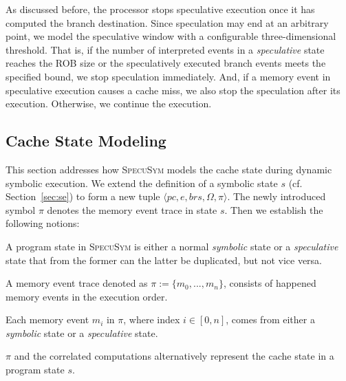 \documentclass[sigconf]{acmart}
\newcommand\ignore[1]{}
\newcommand{\pcon}{\mathit{pc}}
\newcommand{\SpecuSym}{\textsc{SpecuSym} }
\begin{document}
As discussed before, the processor stops speculative execution once it has computed
the branch destination. Since speculation may end at an arbitrary point, we model 
the speculative window with a configurable three-dimensional threshold. That is,
if the number of interpreted events in a \textit{speculative} state reaches the
ROB size or the speculatively executed branch events meets the specified bound, 
we stop speculation immediately. And, if a memory event in speculative execution 
causes a cache miss, we also stop the speculation after its execution. Otherwise, 
we continue the execution.



\subsection{Cache State Modeling}
\label{sec:modeling}


This section addresses how \SpecuSym models the cache state during dynamic
symbolic execution. We extend the definition of a symbolic state $s$ (cf.
Section~\ref{sec:se}) to form a new tuple $\langle \pcon, \mathit{e},
\mathit{brs},\Omega,\pi\rangle$. The newly introduced symbol $\pi$ denotes 
the memory event trace in state $s$. Then we establish the following notions:
%
%
\begin{itemize*}
  \item A program state in \SpecuSym is either a normal \textit{symbolic} state 
	or a \textit{speculative} state that from the former can the latter be 
	duplicated, but not vice versa. 
  \item A memory event trace denoted as $\pi:=\mathit{\{m_0,...,m_n\}}$, 
    consists of happened memory events in the execution order.
  \item Each memory event $\mathit{m_i}$ in $\pi$, where index $i\in [0,n]$, 
	comes from either a \textit{symbolic} state or a \textit{speculative} state.
  \item $\pi$ and the correlated computations alternatively represent the cache 
	state in a program state $s$.
\end{itemize*}
%
%
\ignore{
On modeling the cache state, exsiting tools such as CaSym~\cite{BrotzmanLZTK2018} 
maintains and updates cache mappings during symbolic execution; others like 
Chalice~\cite{ChattopadhyayBRZ17} and \textsc{SymSC}~\cite{GuoWW18} uses 
offline constraint solving to to reason about the cache behaviors of memory 
accesses upon concrete cache models. To better coordinate the speculative 
modeling component, \SpecuSym adopts an on-the-fly analysis.
}
\end{document}
